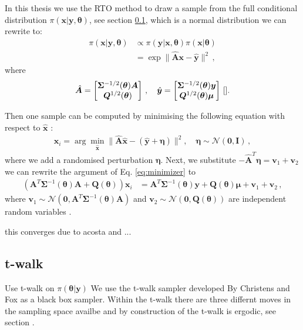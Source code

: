 In this thesis we use the RTO method to draw a sample from the full conditional distribution $\pi( \bm{x}| \bm{y} , \bm{\theta} )$, see section \ref{}, which is a normal distribution we can rewrite to:
\begin{align}
	\pi(\bm{x}|\bm{y}, \bm{\theta} ) &\propto \pi(\bm{y} | \bm{x} , \bm{\theta} ) \pi(\bm{x}| \bm{\theta}) \\
	&= \exp  \lVert \hat{\bm{A}} \bm{x} - \hat{\bm{y}} \rVert^2 \, ,
\end{align}
where 
\begin{align}
	\label{eq:minimizer}
	\hat{\bm{A}} = 
	\begin{bmatrix}
		\bm{\Sigma}^{-1/2}(\bm{\theta})  \bm{A}\\
		\bm{Q}^{1/2}(\bm{\theta}) 
	\end{bmatrix} \, , \quad \hat{\bm{y}} = 
	\begin{bmatrix}
		\bm{\Sigma}^{-1/2}(\bm{\theta})  \bm{y} \\
		\bm{Q}^{1/2}(\bm{\theta}) \bm{\mu}
	\end{bmatrix} \, \text{\cite{}}.
\end{align}

Then one sample can be computed by minimising the following equation with respect to $\hat{\bm{x}}$ :
\begin{align}
	\bm{x}_i = \arg \min_{\hat{\bm{x}}} \lVert \hat{\bm{A}} \hat{\bm{x}} - ( \hat{\bm{y}} + \bm{\eta} ) \rVert^2 , \quad \bm{\eta} \sim \mathcal{N}(\bm{0}, \mathbf{I}) \, ,
\end{align}
where we add a randomised perturbation $\bm{\eta}$.
Next, we substitute $ - \hat{\bm{A}}^T  \bm{\eta}  = \bm{v}_1 + \bm{v}_2$ we can rewrite the argument of Eq. \ref{eq:minimizer} to 
\begin{align}
	\label{eq:RTO}
	(\bm{A}^T \bm{\Sigma}^{-1}(\bm{\theta}) \bm{A}+
	\bm{Q}(\bm{\theta}) ) \bm{x}_i &= \bm{A}^T \bm{\Sigma}^{-1}(\bm{\theta}) \bm{y} +  \bm{Q}(\bm{\theta}) \bm{\mu} + \bm{v}_1 + \bm{v}_2 \,  ,
\end{align}
where $\bm{v}_1 \sim \mathcal{N}(\bm{0}, \bm{A}^T \bm{\Sigma}^{-1}(\bm{\theta}) \bm{A}) $ and $\bm{v}_2 \sim \mathcal{N}(\bm{0}, \bm{Q}(\bm{\theta}) )$ are independent random variables \cite{}.

this converges due to acosta and ...


\subsection{t-walk}
Use t-walk on $	\pi(\bm{\theta}|\bm{y} )$
We use the t-walk sampler developed By Christens and Fox as a black box sampler\cite{}.
Within the t-walk there are three differnt moves in the sampling space availbe and by construction of the t-walk is ergodic, see section \cite{}.




